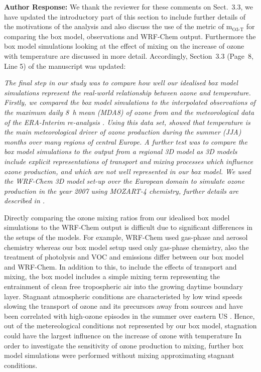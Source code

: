 \documentclass{article}
\begin{document}
\textbf{Author Response:} We thank the reviewer for these comments on Sect.~3.3, we have updated the introductory part of this section to include further details of the motivations of the analysis and also discuss the use of the metric of m$_{\text{O3-T}}$ for comparing the box model, observations and WRF-Chem output. Furthermore the box model simulations looking at the effect of mixing on the increase of ozone with temperature are discussed in more detail. Accordingly, Section~3.3 (Page~8, Line 5) of the manuscript was updated:
{\itshape
The final step in our study was to compare how well our idealised box model simulations represent the real-world relationship between ozone and temperature.
Firstly, we compared the box model simulations to the interpolated observations of the maximum daily 8~h mean (MDA8) of ozone from \citet{Schnell:2015} and the meteorological data of the ERA-Interim re-analysis \citep{Dee:2011}. 
Using this data set, \citet{Otero:2016} showed that temperature is the main meteorological driver of ozone production during the summer (JJA) months over many regions of central Europe.
A further test was to compare the box model simulations to the output from a regional 3D model as 3D models include explicit representations of transport and mixing processes which influence ozone production, and which are not well represented in our box model.
We used the WRF-Chem 3D model set-up over the European domain to simulate ozone production in the year 2007 using MOZART-4 chemistry, further details are described in \citet{Mar:2016}.

Directly comparing the ozone mixing ratios from our idealised box model simulations to the WRF-Chem output is difficult due to significant differences in the setups of the models.
For example, WRF-Chem used gas-phase and aerosol chemistry whereas our box model setup used only gas-phase chemistry, also the treatment of photolysis and VOC and  emissions differ between our box model and WRF-Chem.
In addition to this, to include the effects of transport and mixing, the box model includes a simple mixing term representing the entrainment of clean free tropospheric air into the growing daytime boundary layer.
Stagnant atmospheric conditions are characteristed by low wind speeds slowing the transport of ozone and its precursors away from sources and have been correlated with high-ozone episodes in the summer over eastern US \citep{Jacob:1993}.
Hence, out of the metereological conditions not represented by our box model, stagnation could have the largest influence on the increase of ozone with temperature
In order to investigate the sensitivity of ozone production to mixing, further box model simulations were performed without mixing approximating stagnant conditions. 

}
\end{document}
